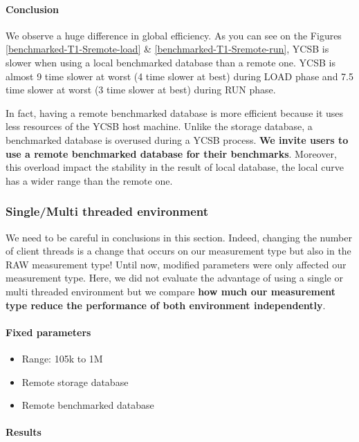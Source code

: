 \documentclass[a4paper,11pt]{report}
\begin{document}
\paragraph{Conclusion}

We observe a huge difference in global efficiency. As you can see on the Figures \ref{benchmarked-T1-Sremote-load} \& \ref{benchmarked-T1-Sremote-run}, YCSB is slower when using a local benchmarked database than a remote one. YCSB is almost 9 time slower at worst (4 time slower at best) during LOAD phase and  7.5 time slower at worst (3 time slower at best) during RUN phase. 

In fact, having a remote benchmarked database is more efficient because it uses less resources of the YCSB host machine. Unlike the storage database, a benchmarked database is overused during a YCSB process. \textbf{We invite users to use a remote benchmarked database for their benchmarks}. Moreover, this overload impact the stability in the result of local database, the local curve has a wider range than the remote one.

\clearpage

\subsubsection{Single/Multi threaded environment}

We need to be careful in conclusions in this section. Indeed, changing the number of client threads is a change that occurs on our measurement type but also in the RAW measurement type! Until now, modified parameters were only affected our measurement type. Here, we did not evaluate the advantage of using a single or multi threaded environment but we compare \textbf{how much our measurement type reduce the performance of both environment independently}.


\paragraph{Fixed parameters}
\begin{itemize}
\item
Range: 105k to 1M
\item
Remote storage database
\item
Remote benchmarked database
\end{itemize}


\paragraph{Results}
\end{document}
